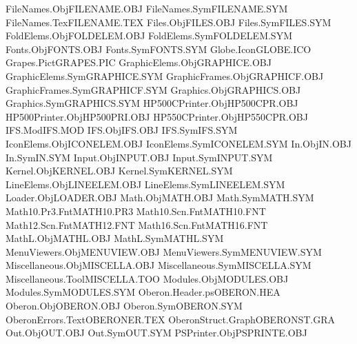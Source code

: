 FileNames.Obj                   FILENAME.OBJ 
FileNames.Sym                   FILENAME.SYM 
FileNames.Tex                   FILENAME.TEX 
Files.Obj                       FILES.OBJ    
Files.Sym                       FILES.SYM    
FoldElems.Obj                   FOLDELEM.OBJ 
FoldElems.Sym                   FOLDELEM.SYM 
Fonts.Obj                       FONTS.OBJ    
Fonts.Sym                       FONTS.SYM    
Globe.Icon                      GLOBE.ICO    
Grapes.Pict                     GRAPES.PIC   
GraphicElems.Obj                GRAPHICE.OBJ 
GraphicElems.Sym                GRAPHICE.SYM 
GraphicFrames.Obj               GRAPHICF.OBJ 
GraphicFrames.Sym               GRAPHICF.SYM 
Graphics.Obj                    GRAPHICS.OBJ 
Graphics.Sym                    GRAPHICS.SYM 
HP500CPrinter.Obj               HP500CPR.OBJ 
HP500Printer.Obj                HP500PRI.OBJ 
HP550CPrinter.Obj               HP550CPR.OBJ 
IFS.Mod                         IFS.MOD      
IFS.Obj                         IFS.OBJ      
IFS.Sym                         IFS.SYM      
IconElems.Obj                   ICONELEM.OBJ 
IconElems.Sym                   ICONELEM.SYM 
In.Obj                          IN.OBJ       
In.Sym                          IN.SYM       
Input.Obj                       INPUT.OBJ    
Input.Sym                       INPUT.SYM    
Kernel.Obj                      KERNEL.OBJ   
Kernel.Sym                      KERNEL.SYM   
LineElems.Obj                   LINEELEM.OBJ 
LineElems.Sym                   LINEELEM.SYM 
Loader.Obj                      LOADER.OBJ   
Math.Obj                        MATH.OBJ     
Math.Sym                        MATH.SYM     
Math10.Pr3.Fnt                  MATH10.PR3   
Math10.Scn.Fnt                  MATH10.FNT   
Math12.Scn.Fnt                  MATH12.FNT   
Math16.Scn.Fnt                  MATH16.FNT   
MathL.Obj                       MATHL.OBJ    
MathL.Sym                       MATHL.SYM    
MenuViewers.Obj                 MENUVIEW.OBJ 
MenuViewers.Sym                 MENUVIEW.SYM 
Miscellaneous.Obj               MISCELLA.OBJ 
Miscellaneous.Sym               MISCELLA.SYM 
Miscellaneous.Tool              MISCELLA.TOO 
Modules.Obj                     MODULES.OBJ  
Modules.Sym                     MODULES.SYM  
Oberon.Header.ps                OBERON.HEA   
Oberon.Obj                      OBERON.OBJ   
Oberon.Sym                      OBERON.SYM   
OberonErrors.Text               OBERONER.TEX 
OberonStruct.Graph              OBERONST.GRA 
Out.Obj                         OUT.OBJ      
Out.Sym                         OUT.SYM      
PSPrinter.Obj                   PSPRINTE.OBJ 
